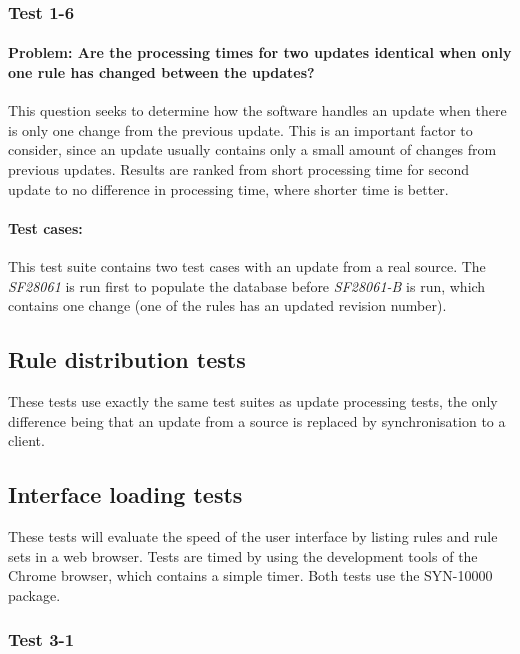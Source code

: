 \subsubsection{Test 1-6}
\paragraph{Problem: Are the processing times for two updates identical when only
one rule has changed between the updates?} This question seeks to determine how
the software handles an update when there is only one change from the previous
update. This is an important factor to consider, since an update usually
contains only a small amount of changes from previous updates. Results are
ranked from short processing time for second update to no difference in
processing time, where shorter time is better.
\paragraph{Test cases:}
This test suite contains two test cases with an update from a real source. The
\textit{SF28061} is run first to populate the database before \textit{SF28061-B}
is run, which contains one change (one of the rules has an updated revision
number).


\subsection{Rule distribution tests}
These tests use exactly the same test suites as update processing tests, the
only difference being that an update from a source is replaced by
synchronisation to a client.

\subsection{Interface loading tests}
These tests will evaluate the speed of the user interface by listing rules and
rule sets in a web browser. Tests are timed by using the development tools of
the Chrome browser, which contains a simple timer. Both tests use the SYN-10000
package.

\subsubsection{Test 3-1}
